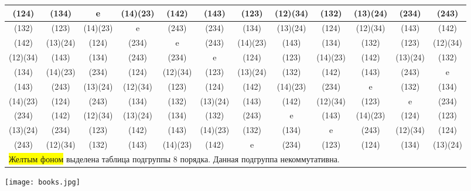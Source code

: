 \documentclass[11pt]{book}
\theoremstyle{mythm}
\theoremstyle{mydef}
\numberwithin{upr}{chapter}
\begin{document}
\begin{table}[h!]
\begin{tabular}{cccccccccccc}
(124) & (134) & e & (14)(23) & (142) & (143) & (123) & (12)(34) & (132) & (13)(24) & (234) & (243) \\ \hline
(132) & (123) & (14)(23) & e & (243) & (234) & (134) & (13)(24) & (124) & (12)(34) & (143) & (142) \\ \hline
(142) & (13)(24) & (124) & (234) & e & (243) & (14)(23) & (143) & (134) & (132) & (123) & (12)(34) \\ \hline
\cellcolor{yellow}(12)(34) & (143) & (134) & (243) & (234) &\cellcolor{yellow} e & (124) & (123) &\cellcolor{yellow} (14)(23) & (142) &\cellcolor{yellow} (13)(24) & (132) \\ \hline
(134) & (14)(23) & (234) & (124) & (12)(34) & (123) & (13)(24) & (132) & (142) & (143) & (243) & e \\ \hline
(143) & (243) & (13)(24) & (12)(34) & (123) & (124) & (142) & (14)(23) & (234) & e & (132) & (134) \\ \hline
\cellcolor{yellow}(14)(23) & (124) & (243) & (134) & (132) &\cellcolor{yellow} (13)(24) & (143) & (142) &\cellcolor{yellow} (12)(34) & (123) &\cellcolor{yellow} e & (234) \\ \hline
(234) & (142) & (12)(34) & (13)(24) & (134) & (132) & (243) & e & (143) & (14)(23) & (124) & (123) \\ \hline
\cellcolor{yellow}(13)(24) & (234) & (123) & (142) & (143) & \cellcolor{yellow}(14)(23) & (132) & (134) &\cellcolor{yellow} e & (243) & \cellcolor{yellow}(12)(34) & (124) \\ \hline
(243) & (12)(34) & (132) & (143) & (14)(23) & (142) & e & (234) & (123) & (124) & (134) & (13)(24) \\ \hline
\multicolumn{12}{l}{\colorbox{yellow}{Желтым фоном} выделена таблица подгруппы 8 порядка. Данная подгруппа некоммутативна.}
\end{tabular}
\end{table}





\newpage
\begin{center}
\texttt{[image: books.jpg]}
\end{center}
\label{ENDPAGE}
\clearpage
\end{document}
